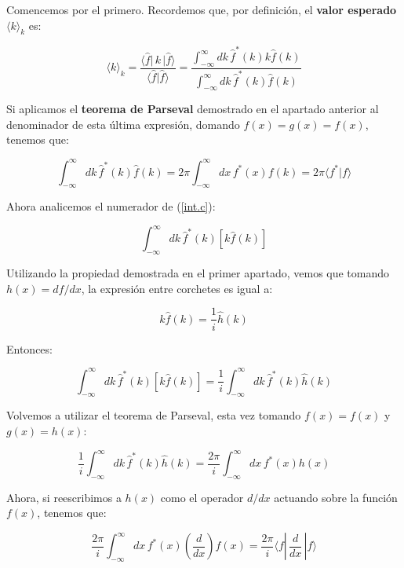 Comencemos por el primero. Recordemos que, por definición, el \textbf{valor esperado} $\langle k \rangle_k$ es:

\begin{equation}\label{int.c}
    \langle k \rangle_k= \frac{\langle \hat{f} |\,k\,|\hat{f}\rangle}{\langle \hat{f}|\hat{f}\rangle}=\frac{\int_{-\infty}^{\infty}dk\,\hat{f}^*(k) k \hat{f}(k)}{\int_{-\infty}^{\infty}dk \,\hat{f}^*(k) \hat{f}(k)}
\end{equation}

Si aplicamos el \textbf{teorema de Parseval} demostrado en el apartado anterior al denominador de esta última expresión, domando $f(x)=g(x)=f(x)$, tenemos que:

\begin{equation}\label{den.c}
    \int_{-\infty}^{\infty}dk \,\hat{f}^*(k) \hat{f}(k)=2\pi \int_{-\infty}^{\infty}dx \,f^*(x) f(k)=2\pi\langle f^*|f\rangle
\end{equation}

Ahora analicemos el numerador de (\ref{int.c}):

\begin{equation}\label{kf.c}
    \int_{-\infty}^{\infty}dk\,\hat{f}^*(k)\left[ k \hat{f}(k)\right]
\end{equation}

Utilizando la propiedad demostrada en el primer apartado, vemos que tomando $h(x)=df/dx$, la expresión entre corchetes es igual a:

\begin{equation}
     k \hat{f}(k)=\frac{1}{i}\hat{h}(k)
\end{equation}

Entonces:

\begin{equation}
    \int_{-\infty}^{\infty}dk\,\hat{f}^*(k)\left[ k \hat{f}(k)\right]=\frac{1}{i} \int_{-\infty}^{\infty}dk\,\hat{f}^*(k)\hat{h}(k)
\end{equation}

Volvemos a utilizar el teorema de Parseval, esta vez tomando $f(x)=f(x)$ y $g(x)=h(x)$:

\begin{equation}
    \frac{1}{i} \int_{-\infty}^{\infty}dk\,\hat{f}^*(k)\hat{h}(k)=\frac{2\pi}{i}\int_{-\infty}^{\infty}dx\,f^*(x)h(x)
\end{equation}

Ahora, si reescribimos a $h(x)$ como el operador $d/dx$ actuando sobre la función $f(x)$, tenemos que:

\begin{equation}\label{num.c}
   \frac{2\pi}{i}\int_{-\infty}^{\infty}dx\,f^*(x) \left(\frac{d}{dx}\right) f(x)=\frac{2\pi}{i}\langle f|\,\frac{d}{dx}\,|f\rangle
\end{equation}

